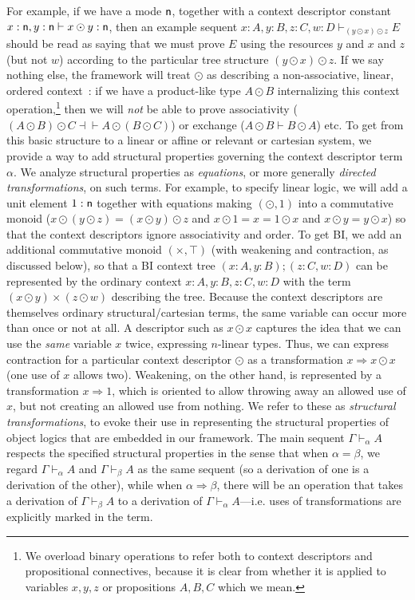 \documentclass[a4paper,USenglish]{lipics-v2016}
\newcommand\spr{\ensuremath{\Rightarrow}} %
\newcommand\seq[3]{\ensuremath{#1 \vdash_{#2} #3}}
\newcommand\citep[1]{\cite{#1}}
\begin{document}
For example, if we have a mode $\mathsf{n}$, together with a context
descriptor constant $x : \mathsf{n}, y:\mathsf{n} \vdash x \odot y : \mathsf{n}$,
then an example sequent \seq{x:A, y:B, z:C, w:D}{(y \odot x) \odot z}{E}
should be read as saying that we must prove $E$ using the resources $y$
and $x$ and $z$ (but not $w$) according to the particular tree structure
${(y \odot x) \odot z}$.  If we say nothing else, the framework will
treat $\odot$ as describing a non-associative, linear, ordered
context~\citep{lambek58calculus}: if we have a product-like type $A
\odot B$ internalizing this context operation,\footnote{We overload
  binary operations to refer both to context descriptors and
  propositional connectives, because it is clear from whether it is
  applied to variables $x,y,z$ or propositions $A,B,C$ which we mean.}
then we will \emph{not} be able to prove associativity ($(A \odot B)
\odot C \dashv\vdash A \odot (B \odot C)$) or exchange ($A \odot B
\vdash B \odot A$) etc.  
To get from this basic structure to a linear or affine or relevant or
cartesian system, we provide a way to add structural properties governing
the context descriptor term $\alpha$.  We analyze structural properties
as \emph{equations}, or more generally \emph{directed transformations},
on such terms.  For example, to specify linear logic, we will add a unit
element $1 : \mathsf{n}$ together with equations making $(\odot,1)$ into a
commutative monoid ($x \odot (y \odot z) = (x \odot y) \odot z$ and 
$x \odot 1 = x = 1 \odot x$ and 
$x \odot y = y \odot x$)
so that the context descriptors ignore associativity and order.  To get
BI, we add an additional commutative monoid $(\times,\top)$ (with
weakening and contraction, as discussed below), so that a BI context
tree $(x:A,y:B);(z:C,w:D)$ can be represented by the ordinary context
$x:A,y:B,z:C,w:D$ with the term $(x \odot y) \times (z \odot w)$
describing the tree.  Because the context descriptors are themselves
ordinary structural/cartesian terms, the same variable can occur more
than once or not at all.  A descriptor such as $x \odot x$ captures the
idea that we can use the \emph{same} variable $x$ twice, expressing
$n$-linear types.  Thus, we can express contraction for a particular
context descriptor $\odot$ as a transformation $x \spr x \odot x$ (one
use of $x$ allows two).  Weakening, on the other hand, is represented by
a transformation $x \spr 1$, which is oriented to allow throwing away an
allowed use of $x$, but not creating an allowed use from nothing.  We
refer to these as \emph{structural transformations}, to evoke their use
in representing the structural properties of object logics that are
embedded in our framework.  The main sequent $\seq{\Gamma}{\alpha}{A}$
respects the specified structural properties in the sense that when
$\alpha = \beta$, we regard $\seq{\Gamma}{\alpha}{A}$ and
$\seq{\Gamma}{\beta}{A}$ as the same sequent (so a derivation of one is
a derivation of the other), while when $\alpha \spr
\beta$, there will be an operation that takes a derivation of
\seq{\Gamma}{\beta}{A} to a derivation of
\seq{\Gamma}{\alpha}{A}---i.e. uses of transformations are explicitly
marked in the term.  
\end{document}

